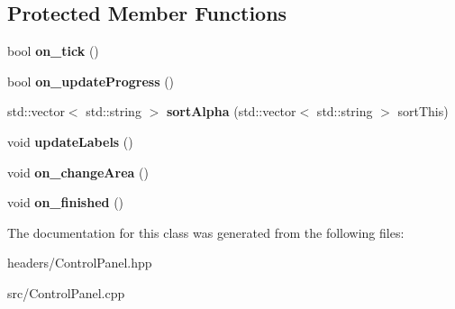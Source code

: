 \subsection*{Protected Member Functions}
\begin{DoxyCompactItemize}
\item 
\hypertarget{classControlPanel_adee0e624d1b83a77e37b8e5dc21fe450}{bool {\bfseries on\-\_\-tick} ()}\label{classControlPanel_adee0e624d1b83a77e37b8e5dc21fe450}

\item 
\hypertarget{classControlPanel_a3a42b25d9cd44beca02b56858d2b3b64}{bool {\bfseries on\-\_\-update\-Progress} ()}\label{classControlPanel_a3a42b25d9cd44beca02b56858d2b3b64}

\item 
\hypertarget{classControlPanel_a51a884870108d1267d1ed631b3dea00e}{std\-::vector$<$ std\-::string $>$ {\bfseries sort\-Alpha} (std\-::vector$<$ std\-::string $>$ sort\-This)}\label{classControlPanel_a51a884870108d1267d1ed631b3dea00e}

\item 
\hypertarget{classControlPanel_af8e669ff68aac439a0de7f0687010a72}{void {\bfseries update\-Labels} ()}\label{classControlPanel_af8e669ff68aac439a0de7f0687010a72}

\item 
\hypertarget{classControlPanel_a648128d5b68bda3ab7768d7e63a6e763}{void {\bfseries on\-\_\-change\-Area} ()}\label{classControlPanel_a648128d5b68bda3ab7768d7e63a6e763}

\item 
\hypertarget{classControlPanel_af39aa7e898a29c9ed388b30dce9b6724}{void {\bfseries on\-\_\-finished} ()}\label{classControlPanel_af39aa7e898a29c9ed388b30dce9b6724}

\end{DoxyCompactItemize}


The documentation for this class was generated from the following files\-:\begin{DoxyCompactItemize}
\item 
headers/Control\-Panel.\-hpp\item 
src/Control\-Panel.\-cpp\end{DoxyCompactItemize}
